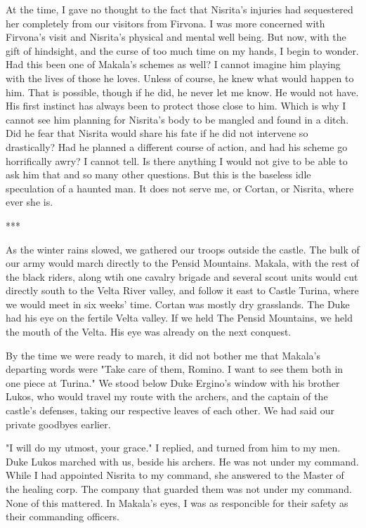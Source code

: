\documentclass{article}
\begin{document}
At the time, I gave no thought to the fact that Nisrita's injuries had sequestered her completely from our visitors from Firvona. I was more concerned with Firvona's visit and Nisrita's physical and mental well being. But now, with the gift of hindsight, and the curse of too much time on my hands, I begin to wonder. Had this been one of Makala's schemes as well? I cannot imagine him playing with the lives of those he loves. Unless of course, he knew what would happen to him. That is possible, though if he did, he never let me know. He would not have. His first instinct has always been to protect those close to him. Which is why I cannot see him planning for Nisrita's body to be mangled and found in a ditch. Did he fear that Nisrita would share his fate if he did not intervene so drastically? Had he planned a different course of action, and had his scheme go horrifically awry? I cannot tell. Is there anything I would not give to be able to ask him that and so many other questions. But this is the baseless idle speculation of a haunted man. It does not serve me, or Cortan, or Nisrita, where ever she is. 

*** 

As the winter rains slowed, we gathered our troops outside the castle. The bulk of our army would march directly to the Pensid Mountains. Makala, with the rest of the black riders, along wtih one cavalry brigade and several scout units would cut directly south to the Velta River valley, and follow it east to Castle Turina, where we would meet in six weeks' time. Cortan was mostly dry grasslands. The Duke had his eye on the fertile Velta valley. If we held The Pensid Mountains, we held the mouth of the Velta. His eye was already on the next conquest. 

By the time we were ready to march, it did not bother me that Makala's departing words were "Take care of them, Romino. I want to see them both in one piece at Turina." We stood below Duke Ergino's window with his brother Lukos, who would travel my route with the archers, and the captain of the castle's defenses, taking our respective leaves of each other. We had said our private goodbyes earlier. 

"I will do my utmost, your grace." I replied, and turned from him to my men. Duke Lukos marched with us, beside his archers. He was not under my command. While I had appointed Nisrita to my command, she answered to the Master of the healing corp. The company that guarded them was not under my command. None of this mattered. In Makala's eyes, I was as responcible for their safety as their commanding officers. 
\end{document}
